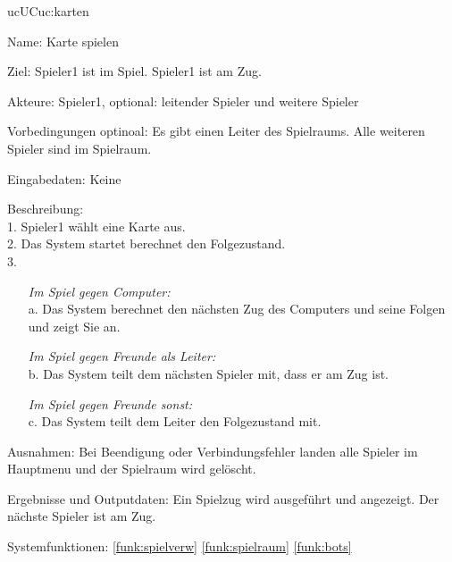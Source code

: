 \begin{description}[leftmargin=5em, style=sameline]
	\begin{lhp}{uc}{UC}{uc:karten}
		\item [Name:] Karte spielen
		\item [Ziel:] Spieler1 ist im Spiel. Spieler1 ist am Zug.
		\item [Akteure:] Spieler1, optional: leitender Spieler und weitere Spieler
		\item [Vorbedingungen] optinoal: Es gibt einen Leiter des Spielraums. Alle weiteren Spieler sind im Spielraum.
		\item [Eingabedaten:] Keine
		\item [Beschreibung:] \hfill\\
				1. Spieler1 wählt eine Karte aus. \\
				2. Das System startet berechnet den Folgezustand. \\
				3.
				\begin{itemize}
				\item[] \textit{Im Spiel gegen Computer:} \\
					a. Das System berechnet den nächsten Zug des Computers und seine Folgen und zeigt Sie an.
				\item[] \textit{Im Spiel gegen Freunde als Leiter:} \\
					b. Das System teilt dem nächsten Spieler mit, dass er am Zug ist.
				\item[] \textit{Im Spiel gegen Freunde sonst:} \\
					c. Das System teilt dem Leiter den Folgezustand mit.
				\end{itemize}
		\item [Ausnahmen:] Bei Beendigung oder Verbindungsfehler landen alle Spieler im Hauptmenu und der Spielraum wird gelöscht.
		\item [Ergebnisse und Outputdaten:] Ein Spielzug wird ausgeführt und angezeigt. Der nächste Spieler ist am Zug.
		\item [Systemfunktionen:] \ref{funk:spielverw} \ref{funk:spielraum} \ref{funk:bots}
	\end{lhp}

\end{description}